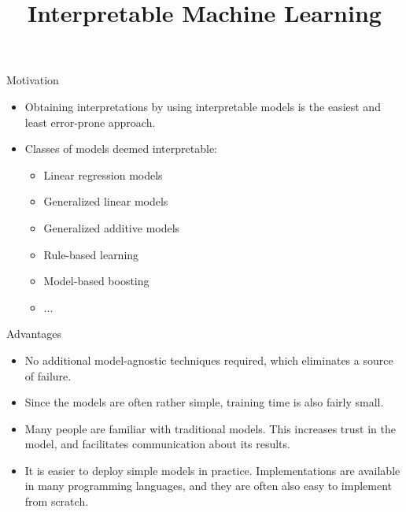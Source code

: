 \documentclass[11pt,compress,t,notes=noshow, xcolor=table]{beamer}
\title{Interpretable Machine Learning}
\institute{\href{https://compstat-lmu.github.io/lecture_iml/}{compstat-lmu.github.io/lecture\_iml}}
\date{}
\begin{document}


\newcommand{\titlefigure}{figure/whitebox}
\newcommand{\learninggoals}{
\item What characteristics does an interpretable model have?
\item Why should we use interpretable models at all?
\item Examples for interpretable models.}





\begin{vbframe}{Motivation}

    \begin{itemize}
        \item Obtaining interpretations by using interpretable models is the easiest and least error-prone approach.
        \bigskip
        \item Classes of models deemed interpretable:
        \begin{itemize}
            \item Linear regression models 
            \item Generalized linear models
            \item Generalized additive models
            \item Rule-based learning
            \item Model-based boosting
            \item ...
        \end{itemize}
    \end{itemize}	
	
\end{vbframe}
	
\begin{vbframe}{Advantages}

    \begin{itemize}
    \itemsep2em
        \item No additional model-agnostic techniques required, which eliminates a source of failure.
        \item Since the models are often rather simple, training time is also fairly small.
        \item Many people are familiar with traditional models. This increases trust in the model, and facilitates communication about its results.
        \item It is easier to deploy simple models in practice. Implementations are available in many programming languages, and they are often also easy to implement from scratch.
    \end{itemize}	
	
\end{vbframe}
\end{document}
